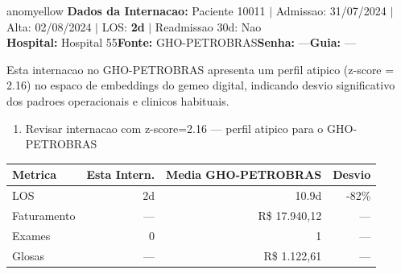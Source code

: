 \documentclass[a4paper,10pt]{article}
\begin{document}
\begin{anomalycard}[Internacao 99971 | GHO-PETROBRAS | MODERADO (z=2.16)]{anomyellow}
\textbf{Dados da Internacao:} Paciente 10011 $\mid$ Admissao: 31/07/2024 $\mid$ Alta: 02/08/2024 $\mid$ LOS: \textbf{2d} $\mid$ Readmissao 30d: Nao\\
\textbf{Hospital:} Hospital 55\quad\textbf{Fonte:} GHO-PETROBRAS\quad\textbf{Senha:} ---\quad\textbf{Guia:} ---\\
\vspace{2pt}\begin{tcolorbox}[colback=severityred!20,colframe=anomyellow,title={\textbf{Interpretacao de Negocio}},fonttitle=\bfseries\small,left=4pt,right=4pt,top=3pt,bottom=3pt]
{\small Esta internacao no GHO-PETROBRAS apresenta um perfil atipico (z-score = 2.16) no espaco de embeddings do gemeo digital, indicando desvio significativo dos padroes operacionais e clinicos habituais.}
\end{tcolorbox}
\begin{tcolorbox}[colback=severityyellow!30,colframe=anomorange,title={\textbf{Recomendacoes Especificas}},fonttitle=\bfseries\small,left=4pt,right=4pt,top=3pt,bottom=3pt]
\begin{enumerate}[nosep,leftmargin=16pt]
\item {\small Revisar internacao com z-score=2.16 --- perfil atipico para o GHO-PETROBRAS}
\end{enumerate}
\end{tcolorbox}
\begin{center}\begin{tabular}{l r r r}\toprule\textbf{Metrica} & \textbf{Esta Intern.} & \textbf{Media GHO-PETROBRAS} & \textbf{Desvio} \\\midrule
LOS & 2d & 10.9d & -82\% \\
Faturamento & --- & R\$ 17.940,12 & --- \\
Exames & 0 & 1 & --- \\
Glosas & --- & R\$ 1.122,61 & --- \\
\bottomrule\end{tabular}\end{center}


\end{anomalycard}
\end{document}
